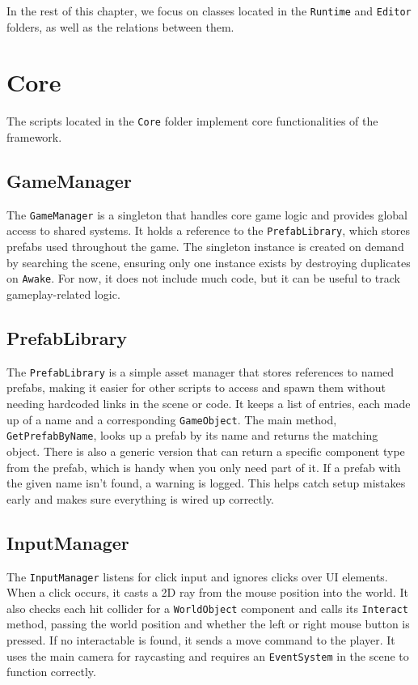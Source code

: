 In the rest of this chapter, we focus on classes located in the \verb|Runtime| and \verb|Editor| folders, as well as the relations between them.

\section{Core}
The scripts located in the \verb|Core| folder implement core functionalities of the framework.

\subsection{GameManager}
The \verb|GameManager| is a singleton that handles core game logic and provides global access to shared systems. It holds a reference to the \verb|PrefabLibrary|, which stores prefabs used throughout the game. The singleton instance is created on demand by searching the scene, ensuring only one instance exists by destroying duplicates on \verb|Awake|. For now, it does not include much code, but it can be useful to track gameplay-related logic.

\subsection{PrefabLibrary}
The \verb|PrefabLibrary| is a simple asset manager that stores references to named prefabs, making it easier for other scripts to access and spawn them without needing hardcoded links in the scene or code. It keeps a list of entries, each made up of a name and a corresponding \verb|GameObject|. The main method, \verb|GetPrefabByName|, looks up a prefab by its name and returns the matching object. There is also a generic version that can return a specific component type from the prefab, which is handy when you only need part of it. If a prefab with the given name isn’t found, a warning is logged. This helps catch setup mistakes early and makes sure everything is wired up correctly.

\subsection{InputManager}
The \verb|InputManager| listens for click input and ignores clicks over UI elements. When a click occurs, it casts a 2D ray from the mouse position into the world. It also checks each hit collider for a \verb|WorldObject| component and calls its \verb|Interact| method, passing the world position and whether the left or right mouse button is pressed. If no interactable is found, it sends a move command to the player. It uses the main camera for raycasting and requires an \verb|EventSystem| in the scene to function correctly. 

